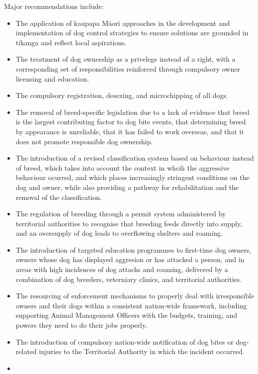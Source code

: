 \documentclass[
  letterpaper,
  DIV=11,
  numbers=noendperiod]{scrartcl}
\begin{document}
Major recommendations include:

\begin{itemize}
\item
  The application of kaupapa Māori approaches in the development and
  implementation of dog control strategies to ensure solutions are
  grounded in tikanga and reflect local aspirations.
\item
  The treatment of dog ownership as a privelege instead of a right, with
  a corresponding set of responsibilities reinforced through compulsory
  owner licensing and education.
\item
  The compulsory registration, desexing, and microchipping of all dogs.
\item
  The removal of breed-specific legislation due to a lack of evidence
  that breed is the largest contributing factor to dog bite events, that
  determining breed by appearance is unreliable, that it has failed to
  work overseas, and that it does not promote responsible dog ownership.
\item
  The introduction of a revised classification system based on behaviour
  instead of breed, which takes into account the context in whcih the
  aggressive behaviour ocurred, and which places increasingly stringent
  conditions on the dog and owner, while also providing a pathway for
  rehabilitation and the removal of the classification.
\item
  The regulation of breeding through a permit system administered by
  territorial authorities to recognise that breeding feeds directly into
  supply, and an oversupply of dog leads to overflowing shelters and
  roaming.
\item
  The introduction of targeted education programmes to first-time dog
  owners, owners whose dog has displayed aggresion or has attacked a
  person, and in areas with high incidences of dog attacks and roaming,
  delivered by a combination of dog breeders, veterniary clinics, and
  territorial authorities.
\item
  The resourcing of enforcement mechanisms to properly deal with
  irresponsible owners and their dogs within a consistent nation-wide
  framework, including supporting Animal Management Officers with the
  budgets, training, and powers they need to do their jobs properly.
\item
  The introduction of compulsory nation-wide notification of dog bites
  or dog-related injuries to the Territorial Authority in which the
  incident occurred.
\item

\end{itemize}
\end{document}
